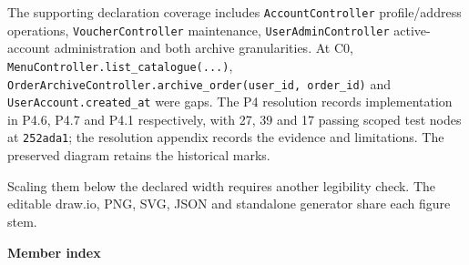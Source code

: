 The supporting declaration coverage includes \texttt{AccountController} profile/address operations, \texttt{VoucherController} maintenance, \texttt{UserAdminController} active-account administration and both archive granularities. At C0, \texttt{MenuController.\allowbreak{}list\_\allowbreak{}catalogue(.\allowbreak{}.\allowbreak{}.\allowbreak{})}, \texttt{OrderArchiveController.\allowbreak{}archive\_\allowbreak{}order(user\_\allowbreak{}id, order\_\allowbreak{}id)} and \texttt{UserAccount.\allowbreak{}created\_\allowbreak{}at} were gaps. The P4 resolution records implementation in P4.6, P4.7 and P4.1 respectively, with 27, 39 and 17 passing scoped test nodes at \texttt{252ada1}; the resolution appendix records the evidence and limitations. The preserved diagram retains the historical \textdagger{} marks.

Scaling them below the declared width requires another legibility check. The editable draw.io, PNG, SVG, JSON and standalone generator share each figure stem.

\textbf{Member index}

